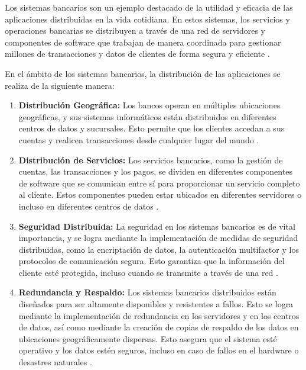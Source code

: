 Los sistemas bancarios son un ejemplo destacado de la utilidad y eficacia de las aplicaciones distribuidas en la vida cotidiana. En estos sistemas, los servicios y operaciones bancarias se distribuyen a través de una red de servidores y componentes de software que trabajan de manera coordinada para gestionar millones de transacciones y datos de clientes de forma segura y eficiente \cite{Priya2023}.

En el ámbito de los sistemas bancarios, la distribución de las aplicaciones se realiza de la siguiente manera:

\begin{enumerate}
	\item \textbf{Distribución Geográfica:} Los bancos operan en múltiples ubicaciones geográficas, y sus sistemas informáticos están distribuidos en diferentes centros de datos y sucursales. Esto permite que los clientes accedan a sus cuentas y realicen transacciones desde cualquier lugar del mundo \cite{Zeng2012distributed}.
	
	\item \textbf{Distribución de Servicios:} Los servicios bancarios, como la gestión de cuentas, las transacciones y los pagos, se dividen en diferentes componentes de software que se comunican entre sí para proporcionar un servicio completo al cliente. Estos componentes pueden estar ubicados en diferentes servidores o incluso en diferentes centros de datos \cite{Ali2023Nav}.
	
	\item \textbf{Seguridad Distribuida:} La seguridad en los sistemas bancarios es de vital importancia, y se logra mediante la implementación de medidas de seguridad distribuidas, como la encriptación de datos, la autenticación multifactor y los protocolos de comunicación segura. Esto garantiza que la información del cliente esté protegida, incluso cuando se transmite a través de una red \cite{Almadani2023,Shivani2023}.
	
	\item \textbf{Redundancia y Respaldo:} Los sistemas bancarios distribuidos están diseñados para ser altamente disponibles y resistentes a fallos. Esto se logra mediante la implementación de redundancia en los servidores y en los centros de datos, así como mediante la creación de copias de respaldo de los datos en ubicaciones geográficamente dispersas. Esto asegura que el sistema esté operativo y los datos estén seguros, incluso en caso de fallos en el hardware o desastres naturales \cite{Ahmed2013,Siddiqui2023}.
\end{enumerate}

